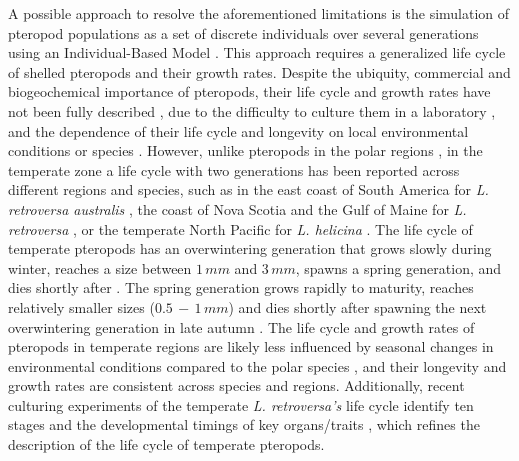 A possible approach to resolve the aforementioned limitations is the simulation of pteropod populations as a set of discrete individuals over several generations using an Individual-Based Model \citep[IBM; ][]{DeAngelis2014IBM}. This approach requires a generalized life cycle of shelled pteropods and their growth rates. Despite the ubiquity, commercial and biogeochemical importance of pteropods, their life cycle and growth rates have not been fully described \citep{Hunt2008TopPredators,Manno2017ReviewPteropodVulnerability}, due to the difficulty to culture them in a laboratory \citep{Howes2014Lab}, and the dependence of their life cycle and longevity on local environmental conditions or species \citep{Bednarsek2012PteropodDistribution,Wang2017Lifecycle,Manno2017ReviewPteropodVulnerability}. However, unlike pteropods in the polar regions \citep[e.g. ][]{Kobayashi1974Growth,Gannefors2005Overwintering,Hunt2008TopPredators,Bednarsek2012Population}, in the temperate zone a life cycle with two generations has been reported across different regions and species, such as in the east coast of South America for \textit{L. retroversa australis}  \citep[][]{Dadon1992Reproduction}, the coast of Nova Scotia and the Gulf of Maine for \textit{L. retroversa} \citep[][]{lalli1989pelagic,Maas2020Lipids}, or the temperate North Pacific for \textit{L. helicina} \citep[][]{Wang2017Lifecycle}. The life cycle of temperate pteropods has an overwintering generation that grows slowly during winter, reaches a size between $1 \, mm$ and $3\, mm$, spawns a spring generation, and dies shortly after \citep{Dadon1992Reproduction,Wang2017Lifecycle,Maas2020Lipids}. The spring generation grows rapidly to maturity, reaches relatively smaller sizes ($0.5\, - \, 1 \, mm$) and dies shortly after spawning the next overwintering generation in late autumn \citep{Dadon1992Reproduction,Wang2017Lifecycle,Maas2020Lipids}. The life cycle and growth rates of pteropods in temperate regions are likely less influenced by seasonal changes in environmental conditions compared to the polar species \citep{Manno2017ReviewPteropodVulnerability}, and their longevity and growth rates are consistent across species and regions. Additionally, recent culturing experiments of the temperate \textit{L. retroversa's} life cycle identify ten stages and the developmental timings of key organs/traits \citep{Howes2014Lab,Thabet2015Lifestages}, which refines the description of the life cycle of temperate pteropods. 

